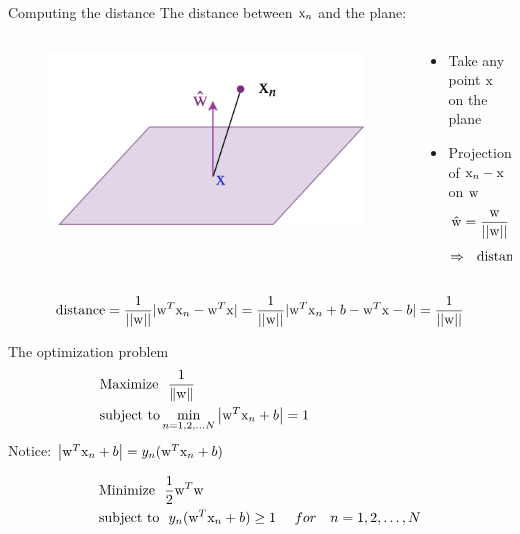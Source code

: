 \begin{frame}{Computing the distance}
The distance between ${\rm x}_n$ and the plane:
\begin{columns}
\begin{column}{4cm}
\begin{figure}
\includegraphics[scale=0.6]{Figures/SVM02.png}
\end{figure}
\end{column}
\begin{column}{6cm}
\begin{itemize}
\item Take any point ${\rm x}$ on the plane
\item Projection of ${\rm x}_n-{\rm x}$ on ${\rm w}$
\[\hat{\rm w}=\frac{\rm w}{||\rm w||}\]
\[\Rightarrow ~~\text{distance}=|\hat{\rm w}^T({\rm x}_n-{\rm x})|\]
%
\end{itemize}

\end{column}
\end{columns}
\[\text{distance} = \frac{1}{||{\rm w}||}|{\rm w}^T{\rm x}_n-{\rm w}^T{\rm x}|= \frac{1}{||{\rm w}||}|{\rm w}^T{\rm x}_n+b-{\rm w}^T{\rm x}-b|=\frac{1}{||{\rm w}||}\]
\end{frame}

\begin{frame}{The optimization problem}
\begin{align*}
&\text{Maximize}~~\frac{1}{{\left\| {\rm w} \right\|}}\\
&\text{subject to}\mathop {\min }\limits_{n = 1,2, \ldots N} \left| {{{\rm w}^T}{{\rm x}_n} + b} \right| = 1~~~~~~~~~~~~~~~~~~~~~~~~
\end{align*}
Notice: $\left| {{{\rm w}^T}{{\rm x}_n} + b} \right|=y_n( {{{\rm w}^T}{{\rm x}_n} + b} )$

\begin{align*}
&\text{Minimize}~~\frac{1}{2}{\rm w} ^T{\rm w}\\
&\text{subject to}~~y_n( {{{\rm w}^T}{{\rm x}_n} + b} ) \geq 1~~~~for~~~n=1,2,\ldots,N
\end{align*}
\end{frame}



